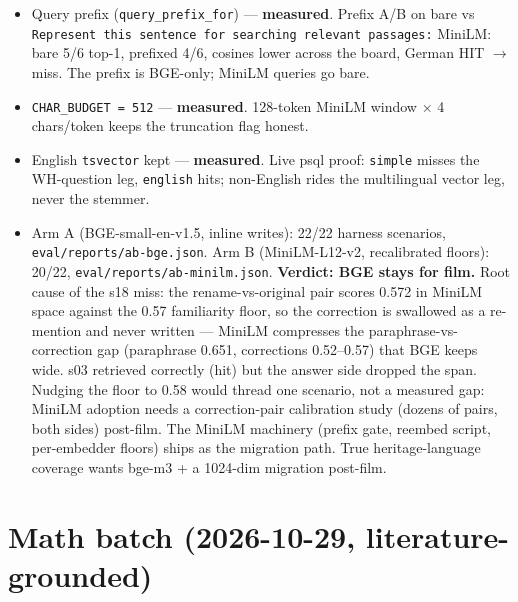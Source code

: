 \begin{itemize}
\item Query prefix (\texttt{query\_prefix\_for}) --- \textbf{measured}.
Prefix A/B on bare vs \texttt{Represent this sentence for searching
relevant passages:} MiniLM: bare 5/6 top-1, prefixed 4/6, cosines lower
across the board, German HIT $\to$ miss. The prefix is BGE-only; MiniLM
queries go bare.
\item \texttt{CHAR\_BUDGET = 512} --- \textbf{measured}. 128-token MiniLM
window $\times$ 4 chars/token keeps the truncation flag honest.
\item English \texttt{tsvector} kept --- \textbf{measured}. Live psql
proof: \texttt{simple} misses the WH-question leg, \texttt{english}
hits; non-English rides the multilingual vector leg, never the stemmer.
\item Arm A (BGE-small-en-v1.5, inline writes): 22/22 harness scenarios,
\texttt{eval/reports/ab-bge.json}. Arm B (MiniLM-L12-v2, recalibrated
floors): 20/22, \texttt{eval/reports/ab-minilm.json}. \textbf{Verdict:
BGE stays for film.} Root cause of the s18 miss: the rename-vs-original
pair scores 0.572 in MiniLM space against the 0.57 familiarity floor, so
the correction is swallowed as a re-mention and never written --- MiniLM
compresses the paraphrase-vs-correction gap (paraphrase 0.651,
corrections 0.52--0.57) that BGE keeps wide. s03 retrieved correctly
(hit) but the answer side dropped the span. Nudging the floor to 0.58
would thread one scenario, not a measured gap: MiniLM adoption needs a
correction-pair calibration study (dozens of pairs, both sides)
post-film. The MiniLM machinery (prefix gate, reembed script,
per-embedder floors) ships as the migration path. True
heritage-language coverage wants bge-m3 + a 1024-dim migration post-film.
\end{itemize}

\section{Math batch (2026-10-29, literature-grounded)}


